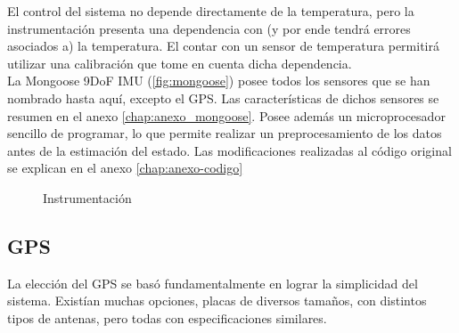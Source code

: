 \documentclass[main]{subfiles}
\begin{document}
El control del sistema no depende directamente de la temperatura, pero la instrumentaci\'on presenta una dependencia con (y por ende tendr\'a errores asociados a) la temperatura. El contar con un sensor de temperatura permitir\'a utilizar una calibraci\'on que tome en cuenta dicha dependencia.\\

La Mongoose 9DoF IMU (\ref{fig:mongoose}) posee todos los sensores que se han nombrado hasta aqu\'i, excepto el GPS. Las caracter\'isticas de dichos sensores se resumen en el anexo \ref{chap:anexo_mongoose}. Posee adem\'as un microprocesador sencillo de programar, lo que permite realizar un preprocesamiento de los datos antes de la estimaci\'on del estado. Las modificaciones realizadas al c\'odigo original se explican en el anexo \ref{chap:anexo-codigo}


\begin{figure} 
  \vspace{-40pt}
  \centering
  \hspace{2cm}
  
  \caption{Instrumentaci\'on}
  \label{fig:intrumentacion}
\end{figure}

\subsection{GPS}

La elecci\'on del GPS se bas\'o fundamentalmente en lograr la simplicidad del sistema. Exist\'ian muchas opciones, placas de diversos tama\~nos, con distintos tipos de antenas, pero todas con especificaciones similares.\\
\end{document}
